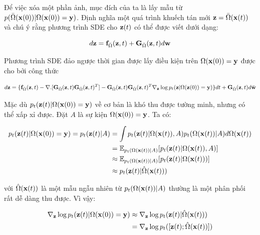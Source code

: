 \documentclass{article} %
\begin{document}
Để việc xóa một phần ảnh, mục đích của ta là lấy mẫu từ $p(\bar{\Omega}(\bold{x}(0)) \vert \Omega(\bold{x}(0))=\bold{y})$.
Định nghĩa một quá trình khuếch tán mới $\bold{z} = \bar{\Omega}(\bold{x}(t))$ và chú ý rằng phương trình SDE cho $\bold{z}(t)$ có thể được viết dưới dạng:

\begin{equation*}
    d \bold{z} = \bold{f}_{\bar{\Omega}} (\bold{z}, t) + \bold{G}_{\bar{\Omega}} (\bold{z}, t) d \bold{w}
\end{equation*}

Phương trình SDE đảo ngược thời gian được lấy điều kiện trên $\Omega(\bold{x}(0))=\bold{y}$ được cho bởi công thức

\begin{equation*}
    d \bold{z} = \lbrace \bold{f}_{\bar{\Omega}} (\bold{z}, t) - \nabla . \lbrack \bold{G}_{\bar{\Omega}}(\bold{z}, t)\bold{G}_{\bar{\Omega}}(\bold{z}, t)^T \rbrack - \bold{G}_{\bar{\Omega}}(\bold{z}, t)\bold{G}_{\bar{\Omega}}(\bold{z}, t)^T \nabla_{\bold{z}} \log p_t (\bold{z} \vert \Omega(\bold{z}(0))=\bold{y}) \rbrace dt + \bold{G}_{\bar{\Omega}}(\bold{z}, t) d \bar{\bold{w}}
\end{equation*}

Mặc dù $p_t(\bold{z}(t) \vert \Omega(\bold{x}(0))=\bold{y})$ về cơ bản là khó thu được tường minh, nhưng có thể xấp xỉ được.
Đặt $A$ là sự kiện $\Omega(\bold{x}(0))=\bold{y}$. Ta có:

\begin{equation*}
    \begin{aligned}
        p_t (\bold{z}(t) \vert \Omega(\bold{x}(0))=\bold{y})=p_t(\bold{z}(t) \vert A) &= \int p_t(\bold{z}(t) \vert \Omega(\bold{x}(t)), A)p_t(\Omega(\bold{x}(t)) \vert A) d \Omega (\bold{x}(t)) \\
        &= \mathbb{E}_{p_t(\Omega(\bold{x}(t)) \vert A)} \lbrack p_t(\bold{z}(t) \vert \Omega(\bold{x}(t)), A) \rbrack \\
        &\approx \mathbb{E}_{p_t(\Omega(\bold{x}(t)) \vert A)} \lbrack p_t(\bold{z}(t) \vert \Omega(\bold{x}(t))) \rbrack \\
        &\approx p_t(\bold{z}(t) \vert \hat{\Omega}(\bold{x}(t)))
    \end{aligned}
\end{equation*}

với $\hat{\Omega}(\bold{x}(t))$ là một mẫu ngẫu nhiên từ $p_t(\Omega(\bold{x}(t)) \vert A)$ thường là một phân phối rất dễ dàng thu được.
Vì vậy:

\begin{equation*}
    \begin{aligned}
        \nabla_{\bold{z}} \log p_t(\bold{z}(t) \vert \Omega(\bold{x}(0))=\bold{y}) &\approx \nabla_{\bold{z}} \log p_t(\bold{z}(t) \vert \hat{\Omega}(\bold{x}(t)))\\
        &= \nabla_{\bold{z}} \log p_t([\bold{z}(t); \hat{\Omega}(\bold{x}(t))])
    \end{aligned}
\end{equation*}
\end{document}
